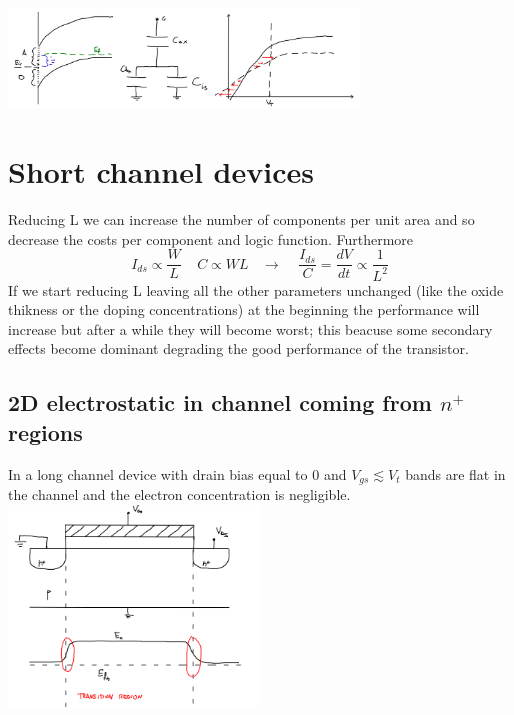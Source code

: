 \centering
\includegraphics[width=0.7\textwidth]{interfacest.png}\\
\raggedright


\section{Short channel devices}

Reducing L we can increase the number of components per unit area and so decrease the costs per component and logic function. Furthermore
\begin{equation}
I_{ds}\propto \frac{W}{L} \ \ \ \ \ C\propto WL \ \ \ \ \rightarrow \ \ \ \ \ \frac{I_{ds}}{C}=\frac{dV}{dt}\propto \frac{1}{L^2}
\end{equation}
If we start reducing L leaving all the other parameters unchanged (like the oxide thikness or the doping concentrations) at the beginning the performance will increase but after a while they will become worst; this beacuse some secondary effects become dominant degrading the good performance of the transistor.

\subsection{2D electrostatic in channel coming from $n^+$ regions}
In a long channel device with drain bias equal to 0 and $V_{gs} \lesssim V_t$ bands are flat in the channel and the electron concentration is negligible.\\

\centering
\includegraphics[width=0.5\textwidth]{longch.png}\\
\raggedright

